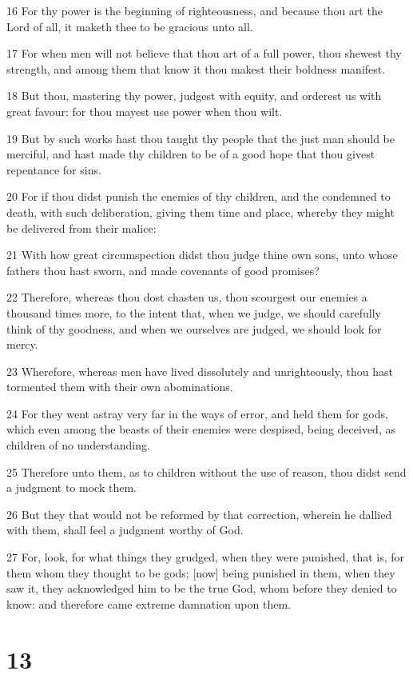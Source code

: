 \par 16 For thy power is the beginning of righteousness, and because thou art the Lord of all, it maketh thee to be gracious unto all.
\par 17 For when men will not believe that thou art of a full power, thou shewest thy strength, and among them that know it thou makest their boldness manifest.
\par 18 But thou, mastering thy power, judgest with equity, and orderest us with great favour: for thou mayest use power when thou wilt.
\par 19 But by such works hast thou taught thy people that the just man should be merciful, and hast made thy children to be of a good hope that thou givest repentance for sins.
\par 20 For if thou didst punish the enemies of thy children, and the condemned to death, with such deliberation, giving them time and place, whereby they might be delivered from their malice:
\par 21 With how great circumspection didst thou judge thine own sons, unto whose fathers thou hast sworn, and made covenants of good promises?
\par 22 Therefore, whereas thou dost chasten us, thou scourgest our enemies a thousand times more, to the intent that, when we judge, we should carefully think of thy goodness, and when we ourselves are judged, we should look for mercy.
\par 23 Wherefore, whereas men have lived dissolutely and unrighteously, thou hast tormented them with their own abominations.
\par 24 For they went astray very far in the ways of error, and held them for gods, which even among the beasts of their enemies were despised, being deceived, as children of no understanding.
\par 25 Therefore unto them, as to children without the use of reason, thou didst send a judgment to mock them.
\par 26 But they that would not be reformed by that correction, wherein he dallied with them, shall feel a judgment worthy of God.
\par 27 For, look, for what things they grudged, when they were punished, that is, for them whom they thought to be gods; [now] being punished in them, when they saw it, they acknowledged him to be the true God, whom before they denied to know: and therefore came extreme damnation upon them.

\chapter{13}

